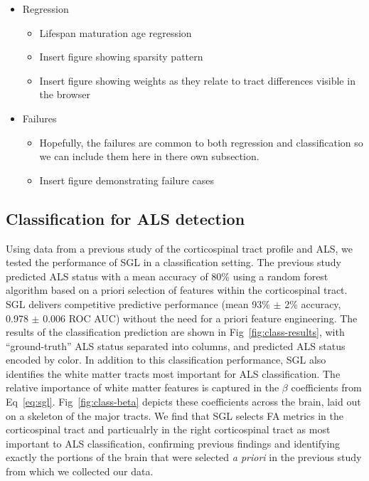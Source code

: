 \begin{itemize}
  \item Regression
    \begin{itemize}
      \item Lifespan maturation age regression
      \item Insert figure showing sparsity pattern
      \item Insert figure showing weights as they relate to tract differences visible in the browser
    \end{itemize}
\end{itemize}
\begin{itemize}
  \item Failures
    \begin{itemize}
      \item Hopefully, the failures are common to both regression
        and classification so we can include them here in there own
        subsection.
      \item Insert figure demonstrating failure cases
    \end{itemize}
\end{itemize}

\subsection*{Classification for ALS detection}

Using data from a previous study of the corticospinal tract profile and
ALS\cite{sarica2017corticospinal}, we tested the performance of SGL in a
classification setting. The previous study predicted ALS status with a mean
accuracy of 80\% using a random forest algorithm based on a priori selection of
features within the corticospinal tract. SGL delivers competitive predictive
performance (mean 93\% $\pm$ 2\% accuracy, 0.978 $\pm$ 0.006 ROC AUC) without
the need for a priori feature engineering. The results of the classification
prediction are shown in Fig~\ref{fig:class-results}, with ``ground-truth'' ALS
status separated into columns, and predicted ALS status encoded by color. In
addition to this classification performance, SGL also identifies the white
matter tracts most important for ALS classification. The relative importance of
white matter features is captured in the $\beta$ coefficients from
Eq~\eqref{eq:sgl}. Fig~\ref{fig:class-beta} depicts these coefficients across
the brain, laid out on a skeleton of the major tracts. We find that SGL selects
FA metrics in the corticospinal tract and particualrly in the right
corticospinal tract as most important to ALS classification, confirming previous
findings\cite{van2011upper, toosy2003diffusion, sarica2014tractography,
sage2007quantitative, sage2009quantitative, karlsborg2004corticospinal,
ellis1999diffusion, cosottini2005diffusion, ciccarelli2009investigation,
abe2010voxel} and identifying exactly the portions of the brain that were
selected \emph{a priori} in the previous study from which we collected our
data\cite{sarica2017corticospinal}.

